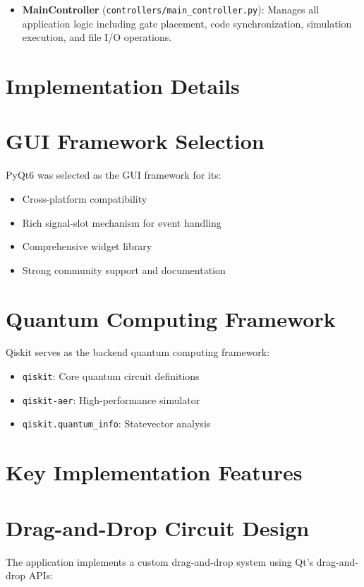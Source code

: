\documentclass[12pt, a4paper, oneside]{report}
\theoremstyle{plain}
\theoremstyle{definition}
\theoremstyle{remark}
\begin{document}
\begin{itemize}
	\item \textbf{MainController} (\texttt{controllers/main\_controller.py}): Manages all application logic including gate placement, code synchronization, simulation execution, and file I/O operations.
\end{itemize}

\section{Implementation Details}

\section{GUI Framework Selection}
PyQt6 was selected as the GUI framework for its:
\begin{itemize}
	\item Cross-platform compatibility
	\item Rich signal-slot mechanism for event handling
	\item Comprehensive widget library
	\item Strong community support and documentation
\end{itemize}

\section{Quantum Computing Framework}
Qiskit serves as the backend quantum computing framework:
\begin{itemize}
	\item \texttt{qiskit}: Core quantum circuit definitions
	\item \texttt{qiskit-aer}: High-performance simulator
	\item \texttt{qiskit.quantum\_info}: Statevector analysis
\end{itemize}

\section{Key Implementation Features}

\section{Drag-and-Drop Circuit Design}
The application implements a custom drag-and-drop system using Qt's drag-and-drop APIs:
\end{document}
